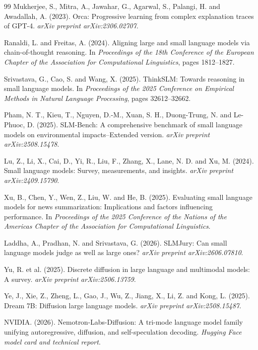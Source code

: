\documentclass[12pt]{article}
\begin{document}
\begin{thebibliography}{99}
Mukherjee, S., Mitra, A., Jawahar, G., Agarwal, S., Palangi, H. and Awadallah, A. (2023).
Orca: Progressive learning from complex explanation traces of GPT-4.
\textit{arXiv preprint arXiv:2306.02707}.

Ranaldi, L. and Freitas, A. (2024).
Aligning large and small language models via chain-of-thought reasoning.
In \textit{Proceedings of the 18th Conference of the European Chapter of the Association for Computational Linguistics}, pages 1812--1827.

Srivastava, G., Cao, S. and Wang, X. (2025).
ThinkSLM: Towards reasoning in small language models.
In \textit{Proceedings of the 2025 Conference on Empirical Methods in Natural Language Processing}, pages 32612--32662.

Pham, N. T., Kieu, T., Nguyen, D.-M., Xuan, S. H., Duong-Trung, N. and Le-Phuoc, D. (2025).
SLM-Bench: A comprehensive benchmark of small language models on environmental impacts--Extended version.
\textit{arXiv preprint arXiv:2508.15478}.

Lu, Z., Li, X., Cai, D., Yi, R., Liu, F., Zhang, X., Lane, N. D. and Xu, M. (2024).
Small language models: Survey, measurements, and insights.
\textit{arXiv preprint arXiv:2409.15790}.

Xu, B., Chen, Y., Wen, Z., Liu, W. and He, B. (2025).
Evaluating small language models for news summarization: Implications and factors influencing performance.
In \textit{Proceedings of the 2025 Conference of the Nations of the Americas Chapter of the Association for Computational Linguistics}.

Laddha, A., Pradhan, N. and Srivastava, G. (2026).
SLMJury: Can small language models judge as well as large ones?
\textit{arXiv preprint arXiv:2606.07810}.

Yu, R. et al. (2025).
Discrete diffusion in large language and multimodal models: A survey.
\textit{arXiv preprint arXiv:2506.13759}.

Ye, J., Xie, Z., Zheng, L., Gao, J., Wu, Z., Jiang, X., Li, Z. and Kong, L. (2025).
Dream 7B: Diffusion large language models.
\textit{arXiv preprint arXiv:2508.15487}.

NVIDIA. (2026).
Nemotron-Labs-Diffusion: A tri-mode language model family unifying autoregressive, diffusion, and self-speculation decoding.
\textit{Hugging Face model card and technical report}.


\end{thebibliography}
\end{document}
